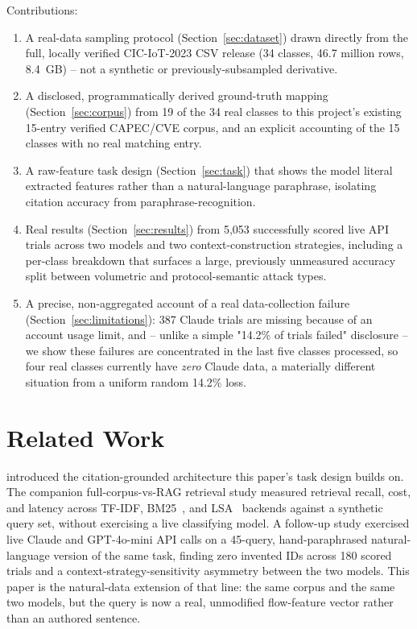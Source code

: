 \documentclass[11pt]{article}
\begin{document}
Contributions:
\begin{enumerate}
    \item A real-data sampling protocol (Section~\ref{sec:dataset}) drawn
    directly from the full, locally verified CIC-IoT-2023 CSV release (34
    classes, 46.7 million rows, 8.4~GB) -- not a synthetic or
    previously-subsampled derivative.
    \item A disclosed, programmatically derived ground-truth mapping
    (Section~\ref{sec:corpus}) from 19 of the 34 real classes to this
    project's existing 15-entry verified CAPEC/CVE corpus, and an explicit
    accounting of the 15 classes with no real matching entry.
    \item A raw-feature task design (Section~\ref{sec:task}) that shows the
    model literal extracted features rather than a natural-language
    paraphrase, isolating citation accuracy from paraphrase-recognition.
    \item Real results (Section~\ref{sec:results}) from 5,053 successfully
    scored live API trials across two models and two context-construction
    strategies, including a per-class breakdown that surfaces a large,
    previously unmeasured accuracy split between volumetric and
    protocol-semantic attack types.
    \item A precise, non-aggregated account of a real data-collection
    failure (Section~\ref{sec:limitations}): 387 Claude trials are missing
    because of an account usage limit, and -- unlike a simple "14.2\% of
    trials failed" disclosure -- we show these failures are concentrated in
    the last five classes processed, so four real classes currently have
    \emph{zero} Claude data, a materially different situation from a
    uniform random 14.2\% loss.
\end{enumerate}

\section{Related Work}

\citet{clearsight2026} introduced the citation-grounded architecture this
paper's task design builds on. The companion full-corpus-vs-RAG retrieval
study measured retrieval recall, cost, and latency across TF-IDF,
BM25~\citep{robertson2009bm25}, and LSA~\citep{deerwester1990lsa} backends
against a synthetic query set, without exercising a live classifying model.
A follow-up study exercised live Claude and GPT-4o-mini API calls on a
45-query, hand-paraphrased natural-language version of the same task,
finding zero invented IDs across 180 scored trials and a
context-strategy-sensitivity asymmetry between the two models. This paper
is the natural-data extension of that line: the same corpus and the same
two models, but the query is now a real, unmodified flow-feature vector
rather than an authored sentence.
\end{document}
